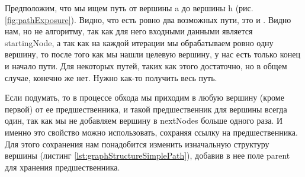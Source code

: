 \documentclass[../../article.tex]{subfiles}
\begin{document}
Предположим, что мы ищем путь от вершины {\firacodebold a} до вершины {\firacodebold h} (рис. \ref{fig:pathExposure}). Видно, что есть ровно два возможных пути, это {\firacodebold [a, h]} и {\firacodebold [a, f, g, h]}. Видно нам, но не алгоритму, так как для него входными данными является {\firacodebold startingNode}, а так как на каждой итерации мы обрабатываем ровно одну вершину, то после того как мы нашли целевую вершину, у нас есть только конец и начало пути. Для некоторых путей, таких как {\firacodebold [a, h]} этого достаточно, но в общем случае, конечно же нет. Нужно как-то получить весь путь.

Если подумать, то в процессе обхода мы приходим в любую вершину (кроме первой) от ее предшественника, и такой предшественник для вершины всегда один, так как мы не добавляем вершину в {\firacodebold nextNodes} больше одного раза. И именно это свойство можно использовать, сохраняя ссылку на предшественника. Для этого сохранения нам понадобится изменить изначальную структуру вершины (листинг \ref{lst:graphStructureSimplePath}), добавив в нее поле {\firacodebold parent} для хранения предшественника.
\end{document}
